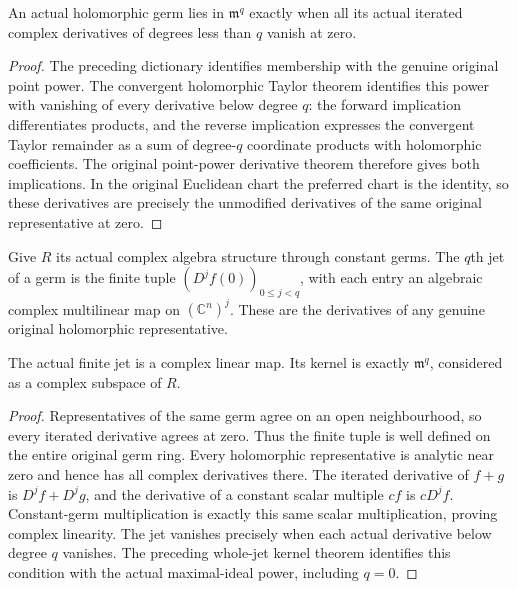 \begin{lemma}
\label{hir:whole-point-power-derivative-kernel}
\leanok
{}
An actual holomorphic germ lies in $\mathfrak m^q$ exactly when all its
actual iterated complex derivatives of degrees less than $q$ vanish at zero.
\end{lemma}
\begin{proof}
The preceding dictionary identifies membership with the genuine original
point power. The convergent holomorphic Taylor theorem identifies this
power with vanishing of every derivative below degree $q$: the forward
implication differentiates products, and the reverse implication expresses
the convergent Taylor remainder as a sum of degree-$q$ coordinate products
with holomorphic coefficients. The original point-power derivative theorem
therefore gives both implications. In the original Euclidean chart the
preferred chart is the identity, so these derivatives are precisely the
unmodified derivatives of the same original representative at zero.
\end{proof}

\begin{definition}
\label{hir:actual-finite-holomorphic-linear-jet}
\leanok
{}
Give $R$ its actual complex algebra structure through constant germs. The
$q$th jet of a germ is the finite tuple $(D^j f(0))_{0\le j<q}$, with each
entry an algebraic complex multilinear map on $(\mathbb C^n)^j$. These
are the derivatives of any genuine original holomorphic representative.
\end{definition}

\begin{lemma}
\label{hir:actual-finite-linear-jet-kernel}
\leanok
{}
The actual finite jet is a complex linear map. Its kernel is exactly
$\mathfrak m^q$, considered as a complex subspace of $R$.
\end{lemma}
\begin{proof}
Representatives of the same germ agree on an open neighbourhood, so every
iterated derivative agrees at zero. Thus the finite tuple is well defined
on the entire original germ ring. Every holomorphic representative is
analytic near zero and hence has all complex derivatives there. The
iterated derivative of $f+g$ is $D^j f+D^j g$, and the derivative of a
constant scalar multiple $cf$ is $cD^j f$. Constant-germ multiplication is
exactly this same scalar multiplication, proving complex linearity.
The jet vanishes precisely when each actual derivative below degree $q$
vanishes. The preceding whole-jet kernel theorem identifies this condition
with the actual maximal-ideal power, including $q=0$.
\end{proof}

